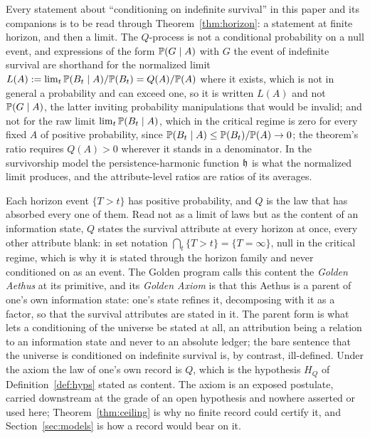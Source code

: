 \begin{remark}\label{rem:limit}
Every statement about ``conditioning on indefinite survival'' in this
paper and its companions is to be read through Theorem~\ref{thm:horizon}:
a statement at finite horizon, and then a limit. The $Q$-process is not a
conditional probability on a null event, and expressions of the form
$\mathbb{P}(G\mid A)$ with $G$ the event of indefinite survival are shorthand for the normalized limit $L(A) := \lim_t \mathbb{P}(B_t \mid A)/\mathbb{P}(B_t) = Q(A)/\mathbb{P}(A)$ where it exists, which is not in general a probability and can exceed one, so it is written $L(A)$ and not $\mathbb{P}(G \mid A)$, the latter inviting probability manipulations that would be invalid; and not for the raw limit $\lim_t \mathbb{P}(B_t \mid A)$, which in the critical regime is zero for every fixed $A$ of positive probability, since $\mathbb{P}(B_t \mid A) \le \mathbb{P}(B_t)/\mathbb{P}(A) \to 0$; the theorem's ratio requires $Q(A) > 0$ wherever it stands in a denominator. In the survivorship model the persistence-harmonic function $\mathfrak{h}$ is what the normalized limit produces, and
the attribute-level ratios are ratios of its averages.
\end{remark}

\begin{remark}
\label{rem:goldenaxiom}
Each horizon event $\{T>t\}$ has positive probability, and $Q$ is the
law that has absorbed every one of them. Read not as a limit of laws
but as the content of an information state, $Q$ states the survival
attribute at every horizon at once, every other attribute blank: in set
notation $\bigcap_t\{T>t\}=\{T=\infty\}$, null in the critical regime,
which is why it is stated through the horizon family and never
conditioned on as an event. The Golden program calls this content the
\emph{Golden Aethus} at its primitive, and its \emph{Golden Axiom} is
that this Aethus is a parent of one's own information state: one's
state refines it, decomposing with it as a factor, so that the survival
attributes are stated in it. The parent form is what lets a conditioning
of the universe be stated at all, an attribution being a relation to an
information state and never to an absolute ledger; the bare sentence
that the universe is conditioned on indefinite survival is, by
contrast, ill-defined. Under the axiom the law of one's own record is
$Q$, which is the hypothesis $H_Q$ of Definition~\ref{def:hyps} stated
as content. The axiom is an exposed postulate, carried downstream at the
grade of an open hypothesis and nowhere asserted or used here;
Theorem~\ref{thm:ceiling} is why no finite record could certify it, and
Section~\ref{sec:models} is how a record would bear on it.
\end{remark}

